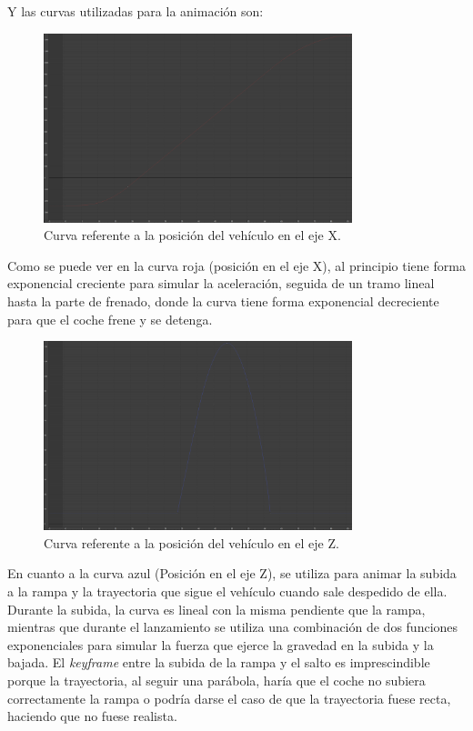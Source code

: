 \documentclass{article}
\begin{document}
Y las curvas utilizadas para la animación son:
\begin{figure}[H]
    \centering
    \includegraphics[width=0.8\textwidth]{imagenes/Ejercicio2/corregidas/curvas/red.png}
    \caption{Curva referente a la posición del vehículo en el eje X.}
\end{figure}

Como se puede ver en la curva roja (posición en el eje X), al principio tiene forma exponencial creciente para simular la aceleración, seguida de un tramo lineal hasta la parte de frenado, donde la curva tiene forma exponencial decreciente para que el coche frene y se detenga.

\begin{figure}[H]
    \centering
    \includegraphics[width=0.8\textwidth]{imagenes/Ejercicio2/corregidas/curvas/blue.png}
    \caption{Curva referente a la posición del vehículo en el eje Z.}
\end{figure}

En cuanto a la curva azul (Posición en el eje Z), se utiliza para animar la subida a la rampa y la trayectoria que sigue el vehículo cuando sale despedido de ella. Durante la subida, la curva es lineal con la misma pendiente que la rampa, mientras que durante el lanzamiento se utiliza una combinación de dos funciones exponenciales para simular la fuerza que ejerce la gravedad en la subida y la bajada. El \textit{keyframe} entre la subida de la rampa y el salto es imprescindible porque la trayectoria, al seguir una parábola, haría que el coche no subiera correctamente la rampa o podría darse el caso de que la trayectoria fuese recta, haciendo que no fuese realista. 
\end{document}
